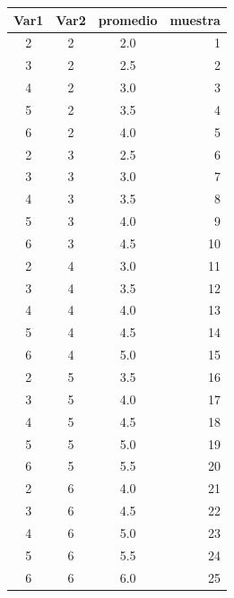 \documentclass[
  10pt,
  ignorenonframetext,
]{beamer}
\begin{document}
\begin{frame}{}
\protect\hypertarget{section-14}{}
\begin{table}
\centering\begingroup\fontsize{7}{9}\selectfont

\begin{tabular}{c|c|c|r}
\hline
Var1 & Var2 & promedio & muestra\\
\hline
2 & 2 & 2.0 & 1\\
\hline
3 & 2 & 2.5 & 2\\
\hline
4 & 2 & 3.0 & 3\\
\hline
5 & 2 & 3.5 & 4\\
\hline
6 & 2 & 4.0 & 5\\
\hline
2 & 3 & 2.5 & 6\\
\hline
3 & 3 & 3.0 & 7\\
\hline
4 & 3 & 3.5 & 8\\
\hline
5 & 3 & 4.0 & 9\\
\hline
6 & 3 & 4.5 & 10\\
\hline
2 & 4 & 3.0 & 11\\
\hline
3 & 4 & 3.5 & 12\\
\hline
4 & 4 & 4.0 & 13\\
\hline
5 & 4 & 4.5 & 14\\
\hline
6 & 4 & 5.0 & 15\\
\hline
2 & 5 & 3.5 & 16\\
\hline
3 & 5 & 4.0 & 17\\
\hline
4 & 5 & 4.5 & 18\\
\hline
5 & 5 & 5.0 & 19\\
\hline
6 & 5 & 5.5 & 20\\
\hline
2 & 6 & 4.0 & 21\\
\hline
3 & 6 & 4.5 & 22\\
\hline
4 & 6 & 5.0 & 23\\
\hline
5 & 6 & 5.5 & 24\\
\hline
6 & 6 & 6.0 & 25\\
\hline
\end{tabular}
\endgroup{}
\end{table}
\end{frame}
\end{document}
